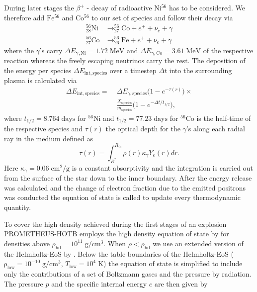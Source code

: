 \documentclass[fleqn,usenatbib]{mnras}
\newcommand{\nickel}{$\mathrm{Ni^{56}}$\xspace}
\newcommand{\iron}{$\mathrm{Fe^{56}}$\xspace}
\newcommand{\cobalt}{$\mathrm{Co^{56}}$\xspace}
\newcommand{\prom}{\textsc{P{\footnotesize ROMETHEUS}-H{\footnotesize OT}B}\xspace}
\begin{document}
During later stages the $\beta^{+}$ - decay of radioactive \nickel has to be considered. We therefore add \iron and \cobalt to our set of species and follow their decay via
\begin{equation}
\begin{split}
    _{28} ^{56} \mathrm{Ni}& \rightarrow _{27} ^{56} \mathrm{Co} + e^+ + \nu_e + \gamma \\
    _{27} ^{56} \mathrm{Co}& \rightarrow _{26} ^{56} \mathrm{Fe} + e^+ + \nu_e + \gamma 
\end{split}
\end{equation}
where the $\gamma$'s carry $\Delta E_{\mathrm{\gamma,Ni}} = 1.72\;\mathrm{MeV}$ and $\Delta E_{\mathrm{\gamma,Co}} =3.61\;\mathrm{MeV}$ of the respective reaction whereas the freely escaping neutrinos carry the rest. The deposition of the energy per species $\Delta E_{\mathrm{int, species}}$ over a timestep $\Delta t$ into the surrounding plasma is calculated via
\begin{equation}
\begin{split}
        \Delta E_{\mathrm{int, species}} = \; &  \Delta E_{\gamma,\mathrm{species}} \Big( 1 - e^{-\tau(r)} \Big) \times\\ \; & \frac{X_{\mathrm{species}}}{m_{\mathrm{species}}} \Big( 1 - e^{-\Delta t / t_{1/2}} \Big),
 \end{split}
\end{equation}where $t_{1/2} = 8.764\; \mathrm{days}$ for $^{56}\mathrm{Ni}$ and $t_{1/2} = 77.23\; \mathrm{days}$  for $^{56}\mathrm{Co}$ is the half-time of the respective species and $\tau(r)$ the optical depth for the $\gamma$'s along each radial ray in the medium defined as
\begin{equation}
    \tau(r) = \int_{R^*}^{R_{ib}}\rho(r) \kappa_{\gamma} Y_e(r) dr.
\end{equation}Here $\kappa_{\gamma}=0.06 \;\mathrm{cm^2/g}$ is a constant absorptivity and the integration is carried out from the surface of the star down to the inner boundary. 
After the energy release was calculated and the change of electron fraction due to the emitted positrons was conducted the equation of state is called to update every thermodynamic quantity.

To cover the high density achieved during the first stages of an explosion \prom  employs the high density equation of state by \citet{Lattimer1991} for densities above $\rho_{\mathrm{hd}}=10^{11}\;\mathrm{g/cm^3}$. When $\rho<\rho_{\mathrm{hd}}$ we use an extended version of the Helmholtz-EoS by \citet{Timmes1999}. Below the table boundaries of the Helmholtz-EoS ($\mathrm{\rho_{low}}=10^{-10}\mathrm{\;g/cm^3}$, $T_{\mathrm{low}}=10^{4}\mathrm{\;K}$) the equation of state is simplified to include only the contributions of a set of Boltzmann gases and the pressure by radiation. The pressure $p$ and the specific internal energy $e$ are then given by
\end{document}
